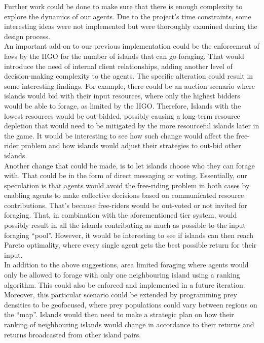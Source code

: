 Further work could be done to make sure that there is enough complexity to explore the dynamics of our agents. Due to the project’s time constraints, some interesting ideas were not implemented but were thoroughly examined during the design process.\\

An important add-on to our previous implementation could be the enforcement of laws by the IIGO for the number of islands that can go foraging. That would introduce the need of internal client relationships, adding another level of decision-making complexity to the agents. The specific alteration could result in some interesting findings. For example, there could be an auction scenario where islands would bid with their input resources, where only the highest bidders would be able to forage, as limited by the IIGO. Therefore, Islands with the lowest resources would be out-bidded, possibly causing a long-term resource depletion that would need to be mitigated by the more resourceful islands later in the game. It would be interesting to see how such change would affect the free-rider problem and how islands would adjust their strategies to out-bid other islands.\\

Another change that could be made, is to let islands choose who they can forage with. That could be in the form of direct messaging or voting. Essentially, our speculation is that agents would avoid the free-riding problem in both cases by enabling agents to make collective decisions based on communicated resource contributions. That’s because free-riders would be out-voted or not invited for foraging. That, in combination with the aforementioned tier system, would possibly result in all the islands contributing as much as possible to the input foraging “pool”.  However, it would be interesting to see if islands can then reach Pareto optimality, where every single agent gets the best possible return for their input.\\

In addition to the above suggestions, area limited foraging where agents would only be allowed to forage with only one neighbouring island using a ranking algorithm. This could also be enforced and implemented in a future iteration. Moreover, this particular scenario could be extended by programming prey densities to be geofocused, where prey populations could vary between regions on the “map”. Islands would then need to make a strategic plan on how their ranking of neighbouring islands would change in accordance to their returns and returns broadcasted from other island pairs.\\

